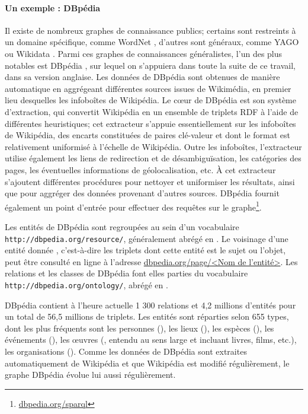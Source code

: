 
\paragraph{Un exemple : DBpédia}

Il existe de nombreux graphes de connaissance publics; certains sont restreints à un domaine spécifique, comme WordNet \cite{miller1998wordnet}, d'autres sont généraux, comme YAGO \cite{suchanek2008yago} ou Wikidata \cite{vrandevcic2014wikidata}. Parmi ces graphes de connaissances généralistes, l'un des plus notables est DBpédia \cite{auer2007dbpedia}, sur lequel on s'appuiera dans toute la suite de ce travail, dans sa version anglaise. Les données de DBpédia sont obtenues de manière automatique en aggrégeant différentes sources issues de Wikimédia, en premier lieu desquelles les infoboîtes de Wikipédia. Le cœur de DBpédia est son système d'extraction, qui convertit Wikipédia en un ensemble de triplets RDF à l'aide de différentes heuristiques; cet extracteur s'appuie essentiellement sur les infoboîtes de Wikipédia, des encarts constituées de paires clé-valeur et dont le format est relativement uniformisé à l'échelle de Wikipédia. Outre les infoboîtes, l'extracteur utilise également les liens de redirection et de désambiguïsation, les catégories des pages, les éventuelles informations de géolocalisation, etc. À cet extracteur s'ajoutent différentes procédures pour nettoyer et uniformiser les résultats, ainsi que pour aggréger des données provenant d'autres sources. DBpédia fournit également un point d'entrée pour effectuer des requêtes sur le graphe\footnote{\href{https://dbpedia.org/sparql}{dbpedia.org/sparql}}.

Les entités de DBpédia sont regroupées au sein d'un vocabulaire \texttt{http://dbpedia.org/resource/}, généralement abrégé en \dbr{}. Le voisinage d'une entité donnée , c'est-à-dire les triplets dont cette entité est le sujet ou l'objet, peut être consulté en ligne à l'adresse \href{http://dbpedia.org/page/<Nom de l'entité>}{dbpedia.org/page/<Nom de l'entité>}. Les relations et les classes de DBpédia font elles parties du vocabulaire \texttt{http://dbpedia.org/ontology/}, abrégé en \dbo{}.


DBpédia contient à l'heure actuelle 1 300 relations et 4,2 millions d'entités pour un total de 56,5 millions de triplets. Les entités sont réparties selon 655 types, dont les plus fréquents sont les personnes (), les lieux (), les espèces (), les événements (), les œuvres (, entendu au sens large et incluant livres, films, etc.), les organisations (). Comme les données de DBpédia sont extraites automatiquement de Wikipédia et que Wikipédia est modifié régulièrement, le graphe DBpédia évolue lui aussi régulièrement.



